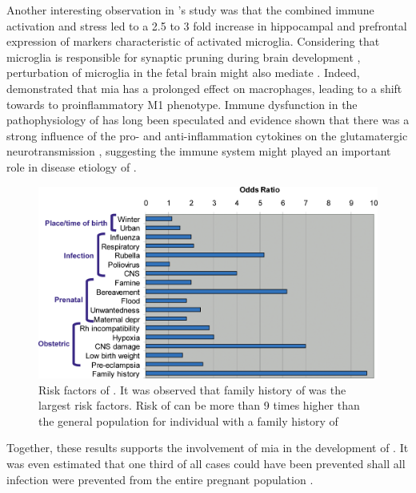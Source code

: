	Another interesting observation in \citet{Giovanoli2013}'s study was that the combined immune activation and stress led to a 2.5 to 3 fold increase in hippocampal and prefrontal expression of markers characteristic of activated microglia.
	Considering that microglia is responsible for synaptic pruning during brain development \citep{Paolicelli2011}, perturbation of microglia in the fetal brain might also mediate .
	Indeed, \citet{Onore2014} demonstrated that \gls{mia} has a prolonged effect on macrophages, leading to a shift towards to proinflammatory M1 phenotype.
	Immune dysfunction in the pathophysiology of  has long been speculated \citep{Muller2010a} and evidence shown that there was a strong influence of the pro- and anti-inflammation cytokines on the glutamatergic neurotransmission \citep{Muller2010a}, suggesting the immune system might played an important role in disease etiology of .
	
	\begin{figure}
		\centering
		\includegraphics[width=\textwidth]{figure/risk_factors_of_schizophrenia.png}
		\caption[Risk factors of ]{Risk factors of .
			It was observed that family history of  was the largest risk factors.
			Risk of  can be more than 9 times higher than the general population for individual with a family history of }
		\label{fig:riskfactors}
	\end{figure}
	
	Together, these results supports the involvement of \gls{mia} in the development of .
	It was even estimated that one third of all  cases could have been prevented shall all infection were prevented from the entire pregnant population \citep{Brown2010}.
	
